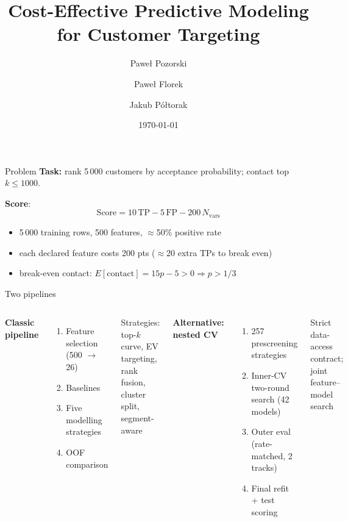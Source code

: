 \documentclass[aspectratio=169]{beamer}
\title[Cost-Effective Customer Targeting]{Cost-Effective Predictive Modeling for Customer Targeting}
\author[Pozorski, Florek, Półtorak]{Paweł Pozorski \and Paweł Florek \and Jakub Półtorak}
\institute{Warsaw University of Technology}
\date{\today}
\begin{document}
\begin{frame}[plain]
    \titlepage
\end{frame}

\begin{frame}{Problem}
    \textbf{Task:} rank 5\,000 customers by acceptance probability; contact top $k \leq 1000$.

    \vspace{0.6em}
    \textbf{Score}:
    \[
        \text{Score} = 10\,\mathrm{TP} - 5\,\mathrm{FP} - 200\,N_{\mathrm{vars}}
    \]

    \begin{itemize}
        \item 5\,000 training rows, 500 features, $\approx$50\% positive rate
        \item each declared feature costs 200 pts ($\approx$20 extra TPs to break even)
        \item break-even contact: $E[\text{contact}] = 15p - 5 > 0 \Rightarrow p > 1/3$
    \end{itemize}
\end{frame}

\begin{frame}{Two pipelines}
    \begin{columns}[T,onlytextwidth]
        \textbf{Classic pipeline}
        \begin{enumerate}\small
            \item Feature selection (500 $\to$ 26)
            \item Baselines
            \item Five modelling strategies
            \item OOF comparison
        \end{enumerate}
        \vspace{0.3em}
        \small Strategies: top-$k$ curve, EV targeting, rank fusion, cluster split, segment-aware

        \textbf{Alternative: nested CV}
        \begin{enumerate}\small
            \item 257 prescreening strategies
            \item Inner-CV two-round search (42 models)
            \item Outer eval (rate-matched, 2 tracks)
            \item Final refit + test scoring
        \end{enumerate}
        \vspace{0.3em}
        \small Strict data-access contract; joint feature--model search
    \end{columns}
\end{frame}
\end{document}
